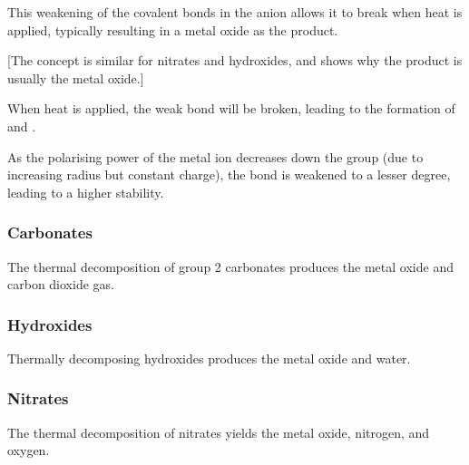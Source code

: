 			This weakening of the covalent bonds in the anion allows it to break when heat is applied,
			typically resulting in a metal oxide as the product.

			[The concept is similar for nitrates and hydroxides, and shows why the product is usually the metal oxide.]

			When heat is applied, the weak bond will be broken, leading to the formation of
			 and .

			As the polarising power of the metal ion decreases down the group (due to increasing radius but
			constant charge), the bond is weakened to a lesser degree, leading to a higher stability.

			\pagebreak
			\subsubsection{Carbonates}

				The thermal decomposition of group 2 carbonates produces the metal oxide and carbon dioxide gas.




			\subsubsection{Hydroxides}

				Thermally decomposing hydroxides produces the metal oxide and water.





			\subsubsection{Nitrates}

				The thermal decomposition of nitrates yields the metal oxide, nitrogen, and oxygen.

